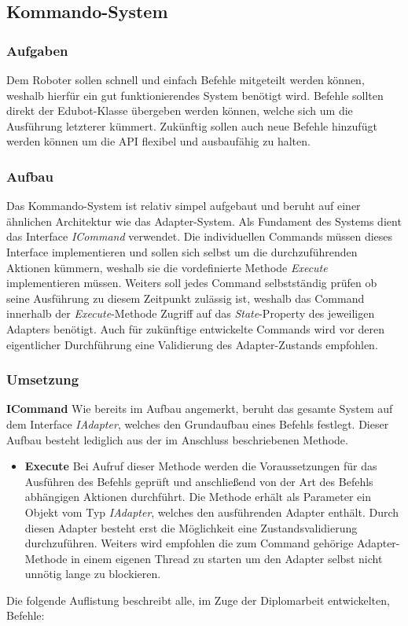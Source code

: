 
\subsection{Kommando-System}

\subsubsection{Aufgaben}
Dem Roboter sollen schnell und einfach Befehle mitgeteilt werden können, weshalb hierfür ein gut funktionierendes System benötigt wird. Befehle sollten direkt der Edubot-Klasse übergeben werden können, welche sich um die Ausführung letzterer kümmert. Zukünftig sollen auch neue Befehle hinzufügt werden können um die API flexibel und ausbaufähig zu halten.

\subsubsection{Aufbau}
Das Kommando-System ist relativ simpel aufgebaut und beruht auf einer ähnlichen Architektur wie das Adapter-System. Als Fundament des Systems dient das Interface \textit{ICommand} verwendet. Die individuellen Commands müssen dieses Interface implementieren und sollen sich selbst um die durchzuführenden Aktionen kümmern, weshalb sie die vordefinierte Methode \textit{Execute} implementieren müssen. Weiters soll jedes Command selbstständig prüfen ob seine Ausführung zu diesem Zeitpunkt zulässig ist, weshalb das Command innerhalb der \textit{Execute}-Methode Zugriff auf das \textit{State}-Property des jeweiligen Adapters benötigt. Auch für zukünftige entwickelte Commands wird vor deren eigentlicher Durchführung eine Validierung des Adapter-Zustands empfohlen.

\subsubsection{Umsetzung}
\textbf{ICommand}
\newline
Wie bereits im Aufbau angemerkt, beruht das gesamte System auf dem Interface \textit{IAdapter}, welches den Grundaufbau eines Befehls festlegt. Dieser Aufbau besteht lediglich aus der im Anschluss beschriebenen Methode.
\begin{itemize}
\item \textbf{Execute}
\newline
Bei Aufruf dieser Methode werden die Voraussetzungen für das Ausführen des Befehls geprüft und anschließend von der Art des Befehls abhängigen Aktionen durchführt. Die Methode erhält als Parameter ein Objekt vom Typ \textit{IAdapter}, welches den ausführenden Adapter enthält. Durch diesen Adapter besteht erst die Möglichkeit eine Zustandsvalidierung durchzuführen. Weiters wird empfohlen die zum Command gehörige Adapter-Methode in einem eigenen Thread zu starten um den Adapter selbst nicht unnötig lange zu blockieren.
\end{itemize}
\newpage
Die folgende Auflistung beschreibt alle, im Zuge der Diplomarbeit entwickelten, Befehle:

